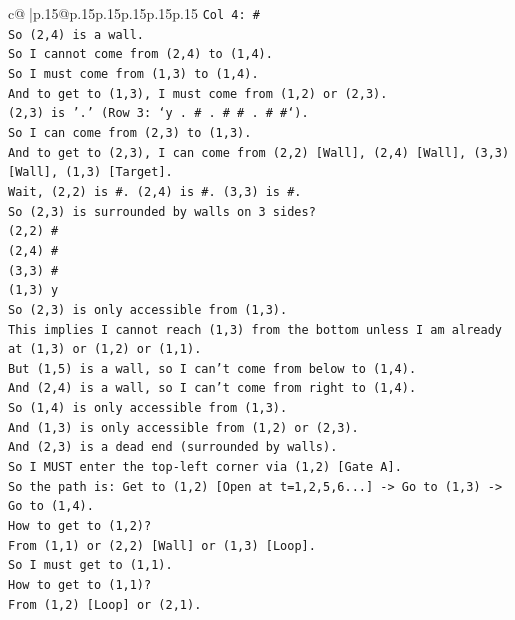 \documentclass{article}
\begin{document}
{\begin{supertabular}{c@{$\;$}|p{.15\linewidth}@{}p{.15\linewidth}p{.15\linewidth}p{.15\linewidth}p{.15\linewidth}p{.15\linewidth}}
{{{\texttt{Col 4: \#} \\
\texttt{So (2,4) is a wall.} \\
\texttt{So I cannot come from (2,4) to (1,4).} \\
\texttt{So I must come from (1,3) to (1,4).} \\
\texttt{And to get to (1,3), I must come from (1,2) or (2,3).} \\
\texttt{(2,3) is '.' (Row 3: `y . \# . \# \# . \# \#`).} \\
\texttt{So I can come from (2,3) to (1,3).} \\
\texttt{And to get to (2,3), I can come from (2,2) {[}Wall{]}, (2,4) {[}Wall{]}, (3,3) {[}Wall{]}, (1,3) {[}Target{]}.} \\
\texttt{Wait, (2,2) is \#. (2,4) is \#. (3,3) is \#.} \\
\texttt{So (2,3) is surrounded by walls on 3 sides?} \\
\texttt{(2,2) \#} \\
\texttt{(2,4) \#} \\
\texttt{(3,3) \#} \\
\texttt{(1,3) y} \\
\texttt{So (2,3) is only accessible from (1,3).} \\
\texttt{This implies I cannot reach (1,3) from the bottom unless I am already at (1,3) or (1,2) or (1,1).} \\
\texttt{But (1,5) is a wall, so I can't come from below to (1,4).} \\
\texttt{And (2,4) is a wall, so I can't come from right to (1,4).} \\
\texttt{So (1,4) is only accessible from (1,3).} \\
\texttt{And (1,3) is only accessible from (1,2) or (2,3).} \\
\texttt{And (2,3) is a dead end (surrounded by walls).} \\
\texttt{So I MUST enter the top{-}left corner via (1,2) {[}Gate A{]}.} \\
\texttt{So the path is: Get to (1,2) {[}Open at t=1,2,5,6...{]} {-}> Go to (1,3) {-}> Go to (1,4).} \\
\texttt{How to get to (1,2)?} \\
\texttt{From (1,1) or (2,2) {[}Wall{]} or (1,3) {[}Loop{]}.} \\
\texttt{So I must get to (1,1).} \\
\texttt{How to get to (1,1)?} \\
\texttt{From (1,2) {[}Loop{]} or (2,1).} \\
}}}
\end{supertabular}}
\end{document}
